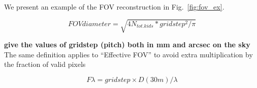 We present an example of the FOV reconstruction in Fig.~\ref{fig:fov_ex}.

\begin{equation}
FOV diameter = \sqrt{4 N_{tot. kids} * gridstep^2/\pi}
\end{equation}

{\bf give the values of gridstep (pitch) both in mm and arcsec on the sky}\\

The same definition applies to ``Effective FOV'' to avoid extra multiplication
by the fraction of valid pixels

\begin{equation}
F\lambda = gridstep\times D(30m)/\lambda
\end{equation}
